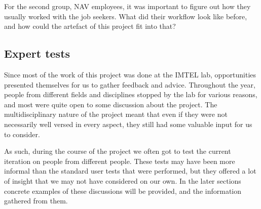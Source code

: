 For the second group, NAV employees, it was important to figure out how they usually worked with the job seekers. What did their workflow look like before, and how could the artefact of this project fit into that?


\subsection{Expert tests}
Since most of the work of this project was done at the IMTEL lab, opportunities presented themselves for us to gather feedback and advice. Throughout the year, people from different fields and disciplines stopped by the lab for various reasons, and most were quite open to some discussion about the project. The multidisciplinary nature of the project meant that even if they were not necessarily well versed in every aspect, they still had some valuable input for us to consider.

As such, during the course of the project we often got to test the current iteration on people from different people. These tests may have been more informal than the standard user tests that were performed, but they offered a lot of insight that we may not have considered on our own. In the later sections concrete examples of these discussions will be provided, and the information gathered from them. 




\cleardoublepage